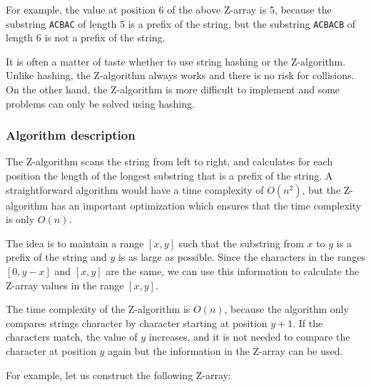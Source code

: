 For example, the value at position 6 of the
above Z-array is 5,
because the substring \texttt{ACBAC} of length 5
is a prefix of the string,
but the substring \texttt{ACBACB} of length 6
is not a prefix of the string.

It is often a matter of taste whether to use
string hashing or the Z-algorithm.
Unlike hashing, the Z-algorithm always works
and there is no risk for collisions.
On the other hand, the Z-algorithm is more difficult
to implement and some problems can only be solved
using hashing.

\subsubsection*{Algorithm description}

The Z-algorithm scans the string from left
to right, and calculates for each position
the length of the longest substring that
is a prefix of the string.
A straightforward algorithm
would have a time complexity of $O(n^2)$,
but the Z-algorithm has an important
optimization which ensures that the time complexity
is only $O(n)$.

The idea is to maintain a range $[x,y]$ such that
the substring from $x$ to $y$ is a prefix of
the string and $y$ is as large as possible.
Since the characters in the ranges $[0,y-x]$
and $[x,y]$ are the same,
we can use this information to calculate
the Z-array values in the range $[x,y]$.

The time complexity of the Z-algorithm is $O(n)$,
because the algorithm only compares strings
character by character starting at position $y+1$.
If the characters match, the value of $y$ increases,
and it is not needed to compare the character at
position $y$ again
but the information in the Z-array can be used.

For example, let us construct the following Z-array:

